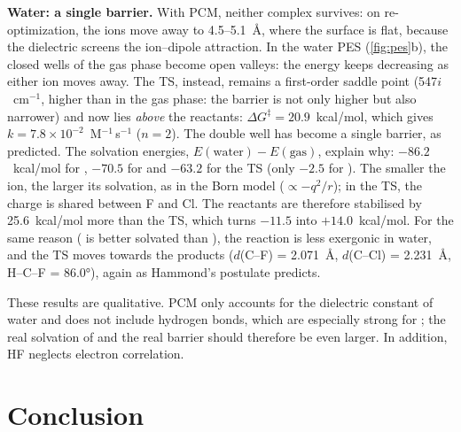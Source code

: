 \documentclass[10pt,a4paper]{article}
\begin{document}
\textbf{Water: a single barrier.} With PCM, neither complex survives: on
re-optimization, the ions move away to 4.5--\SI{5.1}{\angstrom}, where the surface is
flat, because the dielectric screens the ion--dipole attraction. In the water PES
(\cref{fig:pes}b), the closed wells of the gas phase become open valleys: the energy
keeps decreasing as either ion moves away. The TS, instead, remains a first-order
saddle point (547$i$~cm$^{-1}$, higher than in the gas phase: the barrier is not
only higher but also narrower) and now lies \emph{above} the reactants:
$\Delta G^\ddagger = 20.9$~kcal/mol, which gives
$k = 7.8\times10^{-2}$~M$^{-1}$\,s$^{-1}$ ($n = 2$). The double well has become a
single barrier, as predicted. The solvation energies, $E(\text{water}) -
E(\text{gas})$, explain why: $-86.2$~kcal/mol for , $-70.5$ for  and
$-63.2$ for the TS (only $-2.5$ for ). The smaller the ion, the larger its
solvation, as in the Born model ($\propto -q^2/r$); in the TS, the charge is shared
between F and Cl. The reactants are therefore stabilised by 25.6~kcal/mol more than
the TS, which turns $-11.5$ into $+14.0$~kcal/mol. For the same reason
( is better solvated than ), the reaction is less exergonic in water,
and the TS moves towards the products ($d$(C--F) = \SI{2.071}{\angstrom},
$d$(C--Cl) = \SI{2.231}{\angstrom}, H--C--F = \ang{86.0}), again as Hammond's
postulate predicts.


These results are qualitative. PCM only accounts for the dielectric constant of
water and does not include hydrogen bonds, which are especially strong for
; the real solvation of  and the real barrier should therefore be even
larger. In addition, HF neglects electron correlation.

\section{Conclusion} %
\end{document}

